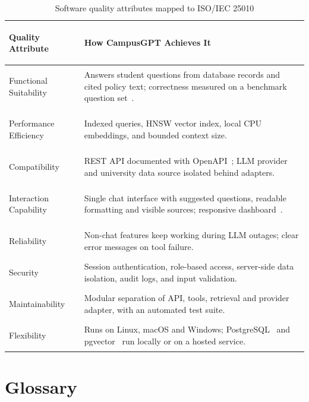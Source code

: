 \documentclass[11pt,a4paper,oneside]{report}
\begin{document}
\begin{table}[H]
\centering
\caption{Software quality attributes mapped to ISO/IEC 25010}
\label{tab:quality}
\begin{tabularx}{\textwidth}{@{}>{\bfseries\raggedright\arraybackslash}p{3.8cm}Y@{}}
\toprule
\textnormal{\textbf{Quality Attribute}} & \textbf{How CampusGPT Achieves It}\\
\midrule
Functional Suitability & Answers student questions from database records and cited policy
text; correctness measured on a benchmark question set~\cite{es2024ragas}.\\
Performance Efficiency & Indexed queries, HNSW vector index, local CPU embeddings, and
bounded context size.\\
Compatibility & REST API documented with OpenAPI~\cite{fastapi}; LLM provider and
university data source isolated behind adapters.\\
Interaction Capability & Single chat interface with suggested questions, readable formatting
and visible sources; responsive dashboard~\cite{nextjs}.\\
Reliability & Non-chat features keep working during LLM outages; clear error messages on
tool failure.\\
Security & Session authentication, role-based access, server-side data isolation, audit
logs, and input validation.\\
Maintainability & Modular separation of API, tools, retrieval and provider adapter, with an
automated test suite.\\
Flexibility & Runs on Linux, macOS and Windows; PostgreSQL~\cite{postgresql} and
pgvector~\cite{pgvector} run locally or on a hosted service.\\
\bottomrule
\end{tabularx}
\end{table}

\appendix
\chapter{Glossary}
\end{document}
